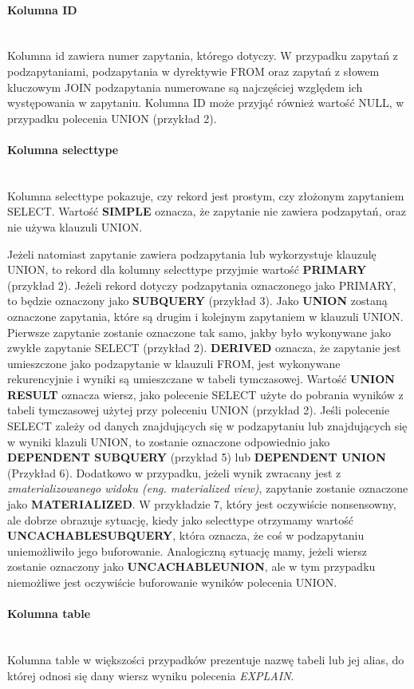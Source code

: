 \paragraph{Kolumna ID}\leavevmode\\
Kolumna id zawiera numer zapytania, którego dotyczy. W przypadku zapytań z podzapytaniami, podzapytania w dyrektywie FROM oraz zapytań z słowem kluczowym JOIN podzapytania numerowane są najczęściej względem ich występowania w zapytaniu. Kolumna ID może przyjąć również wartość NULL, w przypadku polecenia UNION (przykład 2).

\paragraph{Kolumna select\textunderscore type}\leavevmode\\
Kolumna select\textunderscore type pokazuje, czy rekord jest prostym, czy złożonym zapytaniem SELECT. 
Wartość \textbf{SIMPLE} oznacza, że zapytanie nie zawiera podzapytań, oraz nie używa klauzuli UNION.

Jeżeli natomiast zapytanie zawiera podzapytania lub wykorzystuje klauzulę UNION, to rekord dla kolumny select\textunderscore type przyjmie wartość \textbf{PRIMARY} (przykład 2). Jeżeli rekord dotyczy podzapytania oznaczonego jako PRIMARY, to będzie oznaczony jako \textbf{SUBQUERY} (przykład 3). Jako \textbf{UNION} zostaną oznaczone zapytania, które są drugim i kolejnym zapytaniem w klauzuli UNION. Pierwsze zapytanie zostanie oznaczone tak samo, jakby było wykonywane jako zwykłe zapytanie SELECT (przykład 2). \textbf{DERIVED} oznacza, że zapytanie jest umieszczone jako podzapytanie w klauzuli FROM, jest wykonywane rekurencyjnie i wyniki są umieszczane w tabeli tymczasowej. Wartość \textbf{UNION RESULT} oznacza wiersz, jako polecenie SELECT użyte do pobrania wyników z tabeli tymczasowej użytej przy poleceniu UNION (przykład 2). Jeśli polecenie SELECT zależy od danych znajdujących się w podzapytaniu lub znajdujących się w wyniki klazuli UNION, to zostanie oznaczone odpowiednio jako \textbf{DEPENDENT SUBQUERY} (przykład 5) lub \textbf{DEPENDENT UNION} (Przykład 6). Dodatkowo w przypadku, jeżeli wynik zwracany jest z \textit{zmaterializowanego widoku (eng. materialized view)}, zapytanie zostanie oznaczone jako \textbf{MATERIALIZED}. W przykładzie 7, który jest oczywiście nonsensowny, ale dobrze obrazuje sytuację, kiedy jako select\textunderscore type otrzymamy wartość \textbf{UNCACHABLE\textunderscore SUBQUERY}, która oznacza, że coś w podzapytaniu uniemożliwiło jego buforowanie. Analogiczną sytuację mamy, jeżeli wiersz zostanie oznaczony jako \textbf{UNCACHABLE\textunderscore UNION}, ale w tym przypadku niemożliwe jest oczywiście buforowanie wyników polecenia UNION.

\paragraph{Kolumna table}\leavevmode\\
Kolumna table w większości przypadków prezentuje nazwę tabeli lub jej alias, do której odnosi się dany wiersz wyniku polecenia \textit{EXPLAIN}. 